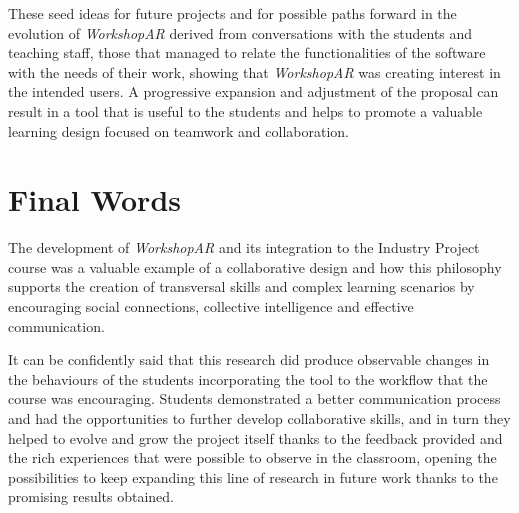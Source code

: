 These seed ideas for future projects and for possible paths forward in the evolution of \emph{WorkshopAR} derived from conversations with the students and teaching staff, those that managed
to relate the functionalities of the software with the needs of their work, showing that \emph{WorkshopAR} was creating interest in the intended users. A progressive expansion and adjustment
of the proposal can result in a tool that is useful to the students and helps to promote a valuable learning design focused on teamwork and collaboration.

\section{Final Words \label{sec:7-4}}

The development of \emph{WorkshopAR} and its integration to the Industry Project course was a valuable example of a collaborative design and how this philosophy supports the creation of
transversal skills and complex learning scenarios by encouraging social connections, collective intelligence and effective communication.

It can be confidently said that this research did produce observable changes in the behaviours of the students incorporating the tool to the workflow that the course was encouraging. Students
demonstrated a better communication process and had the opportunities to further develop collaborative skills, and in turn they helped to evolve and grow the project itself thanks to the
feedback provided and the rich experiences that were possible to observe in the classroom, opening the possibilities to keep expanding this line of research in future work thanks to the
promising results obtained.